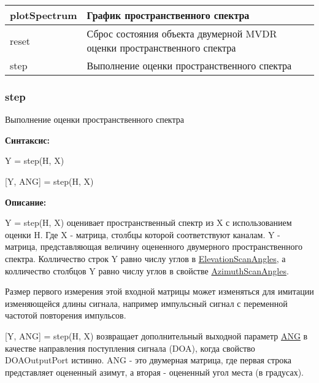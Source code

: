 \begin{longtable}{|p{6cm}|p{11cm}|} \hline
	plotSpectrum
	&
	График пространственного спектра \\ 
	\hline
	reset
	&
	Сброс состояния объекта двумерной MVDR оценки пространственного спектра \\ 
	\hline
	step
	&
	Выполнение оценки пространственного спектра \\ 
	\hline
\end{longtable}

\subsubsection{step}

Выполнение оценки пространственного спектра

\textbf{Синтаксис:}
\begin{center}
Y = step(H, X)

[Y, ANG] = step(H, X)
\end{center}

\textbf{Описание:}

Y = step(H, X) оценивает пространственный спектр из X с использованием оценки H. Где X - матрица, столбцы которой соответствуют каналам. Y - матрица, представляющая величину оцененного двумерного пространственного спектра. Колличество строк Y равно числу углов в \underline{ElevationScanAngles}, а колличество столбцов Y равно числу углов в свойстве \underline{AzimuthScanAngles}.

Размер первого измерения этой входной матрицы может изменяться для имитации изменяющейся длины сигнала, например импульсный сигнал с переменной частотой повторения импульсов.

[Y, ANG] = step(H, X) возвращает дополнительный выходной параметр \underline{ANG} в качестве направления поступления сигнала (DOA), когда свойство DOAOutputPort истинно. ANG - это двумерная матрица, где первая строка представляет оцененный азимут, а вторая - оцененный угол места (в градусах).